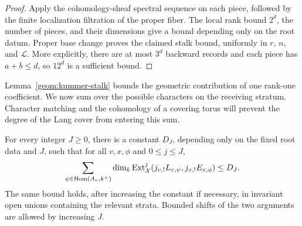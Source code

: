 \begin{proof}
Apply the cohomology-sheaf spectral sequence on each piece, followed
by the finite localization filtration of the proper fiber. The local
rank bound \(2^d\), the number of pieces, and their dimensions give a
bound depending only on the root datum. Proper base change proves
the claimed stalk bound, uniformly in \(r\), \(n\), and \(\mathcal L\).
More explicitly, there are at most \(3^d\) backward records and each
piece has \(a+b\le d\), so \(12^d\) is a sufficient bound.
\end{proof}

Lemma~\ref{geom:kummer-stalk} bounds the geometric contribution of
one rank-one coefficient.  We now sum over the possible characters
on the receiving stratum.  Character matching and the cohomology
of a covering torus will prevent the degree of the Lang cover
from entering this sum.

\begin{proposition}\label{geom:summed-ext}
For every integer \(J\ge0\), there is a constant \(D_J\), depending
only on the fixed root data and \(J\), such that for all \(v,x,\phi\)
and \(0\le j\le J\),
\begin{equation}\label{geom:ext-bound}
 \sum_{\psi\in\operatorname{Hom}(A_v,k^\times)}
 \dim_k\operatorname{Ext}^j_{\mathcal X}
       (j_{v,!}L_{v,\psi},j_{x,!}E_{x,\phi})\le D_J.
\end{equation}
The same bound holds, after increasing the constant if necessary, in
invariant open unions containing the relevant strata. Bounded shifts
of the two arguments are allowed by increasing \(J\).
\end{proposition}

